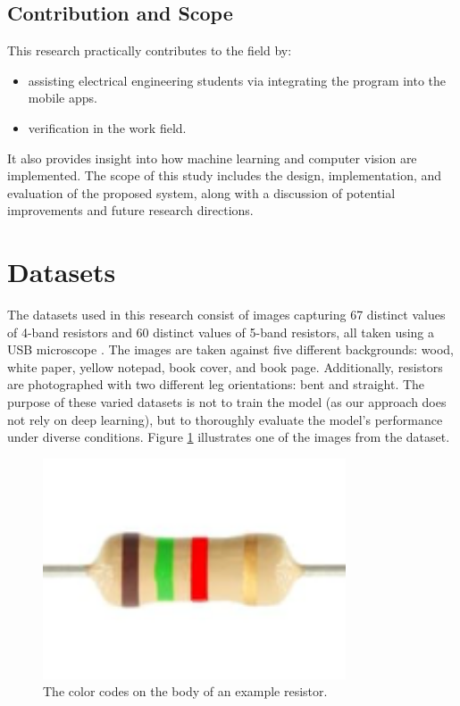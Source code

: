 \documentclass[preprint,12pt,3p,times]{elsarticle}
\begin{document}
\subsection{Contribution and Scope}
This research practically contributes to the field by:
\begin{itemize}
\item assisting electrical engineering students via integrating the program into the mobile apps.
\item verification in the work field.
\end{itemize}
It also provides insight into how machine learning and computer vision are implemented.
The scope of this study includes the design, implementation, and evaluation of the proposed system, along with a discussion of potential improvements and future research directions.

\section{Datasets}
The datasets used in this research consist of images capturing 67 distinct values of 4-band resistors and 60 distinct values of 5-band resistors, all taken using a USB microscope \cite{ref3}. The images are taken against five different backgrounds: wood, white paper, yellow notepad, book cover, and book page. Additionally, resistors are photographed with two different leg orientations: bent and straight. The purpose of these varied datasets is not to train the model (as our approach does not rely on deep learning), but to thoroughly evaluate the model's performance under diverse conditions. Figure \ref{f_resistors} illustrates one of the images from the dataset.

\begin{figure}[!h]
    \centering
    \includegraphics[width=0.8\textwidth]{resistor3.png}
    \caption{\label{f_resistors}The color codes on the body of an example resistor.}
\end{figure}
\end{document}
